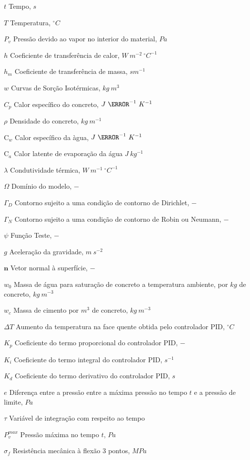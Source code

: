 \documentclass[
	12pt,				%
	openright,			%
	twoside,			%
	a4paper,			%
	chapter=TITLE,		%
	english,			%
	french,				%
	spanish,			%
	brazil,				%
	hyphens,
  oldfontcommands]{abntex2}
\theoremstyle{definition}
\newcommand{\C}{\bm{\mathrm{C}}}
\theoremstyle{definition}
\begin{document}
\begin{simbolos}
  \item[$ t $] Tempo, $s$
  \item[$ T $] Temperatura, $^{\circ}C$
  \item[$ P_v $] Pressão devido ao vapor no interior do material, $Pa$
  \item[$ h $] Coeficiente de transferência de calor, $W \ m^{-2} \
    ^{\circ}C^{-1}$
  \item[$ h_m $] Coeficiente de transferência de massa, $s m^{-1}$
  \item[$ w $] Curvas de Sorção Isotérmicas, $kg \ m^3$
  \item[$ C_p $] Calor específico do concreto, $J \ \kg^{-1} \ K^{-1}$
  \item[$ \rho $]  Densidade do concreto, $kg \ m^{-1}$
  \item[$ \C_w $]  Calor específico da àgua, $J \ \kg^{-1} \ K^{-1}$
  \item[$ \C_a $] Calor latente de evaporação da água $J \ kg^{-1}$
  \item[$ \lambda $] Condutividade térmica, $W \ m^{-1} \ ^{\circ}C^{-1}$
  \item[$ \Omega $] Domínio do modelo, $-$ 
  \item[$ \Gamma_D $] Contorno sujeito a uma condição de contorno de Dirichlet, $-$
  \item[$ \Gamma_N $] Contorno sujeito a uma condição de contorno de Robin ou
    Neumann, $-$
  \item[$ \psi $] Função Teste, $-$
  \item[$ g $] Aceleração da gravidade, $m \ s^{-2}$
  \item[$ \mathbf{n} $] Vetor normal à superfície, $-$
  \item[$ w_0 $]  Massa de água para saturação de concreto a temperatura
    ambiente, por $kg$ de concreto, $kg \ m^{-3}$
  \item[$ w_c $]  Massa de cimento por $m^3$ de concreto, $kg \ m^{-3}$
  \item[$ \Delta T $] Aumento da temperatura na face quente obtida pelo
    controlador PID, $ ^{\circ}C $ 
  \item[$ K_p $] Coeficiente do termo proporcional do controlador PID, $-$
  \item[$ K_i $] Coeficiente do termo integral do controlador PID, $ s^{-1} $
  \item[$ K_d $] Coeficiente do termo derivativo do controlador PID, $ s $
  \item[$ e $] Diferença entre a pressão entre a máxima pressão no tempo $ t $ e a
    pressão de limite, $ Pa $
  \item[$ \tau $] Variável de integração com respeito ao tempo 
  \item[$ P_v^{max} $] Pressão máxima no tempo $t$, $ Pa $
  \item[$ \sigma_f $] Resistência mecânica à flexão 3 pontos, $MPa$
    
\end{simbolos}
\end{document}
